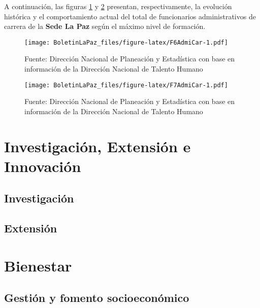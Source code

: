 \documentclass[
]{book}
\begin{document}
A continuación, las figuras \ref{fig:F6AdmiCar} y \ref{fig:F7AdmiCar} presentan, respectivamente, la evolución histórica y el comportamiento actual del total de funcionarios administrativos de carrera de la \textbf{Sede La Paz} según el máximo nivel de formación.

\begin{figure}
\centering
\texttt{[image: BoletinLaPaz\_files/figure-latex/F6AdmiCar-1.pdf]}
\caption{\label{fig:F6AdmiCar}Fuente: Dirección Nacional de Planeación y Estadística con base en información de la Dirección Nacional de Talento Humano}
\end{figure}

\begin{figure}
\centering
\texttt{[image: BoletinLaPaz\_files/figure-latex/F7AdmiCar-1.pdf]}
\caption{\label{fig:F7AdmiCar}Fuente: Dirección Nacional de Planeación y Estadística con base en información de la Dirección Nacional de Talento Humano}
\end{figure}

\hypertarget{Inv}{%
\chapter{Investigación, Extensión e Innovación}\label{Inv}}

\hypertarget{investigaciuxf3n}{%
\section{Investigación}\label{investigaciuxf3n}}

\hypertarget{extensiuxf3n}{%
\section{Extensión}\label{extensiuxf3n}}

\hypertarget{Bie}{%
\chapter{Bienestar}\label{Bie}}

\hypertarget{gestiuxf3n-y-fomento-socioeconuxf3mico}{%
\section{Gestión y fomento socioeconómico}\label{gestiuxf3n-y-fomento-socioeconuxf3mico}}

  
\end{document}
